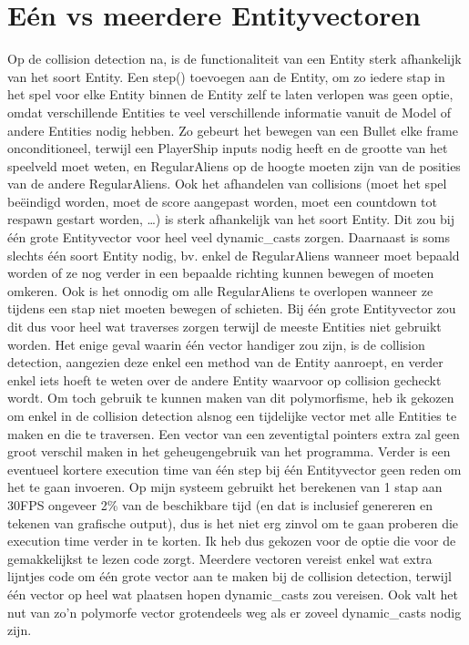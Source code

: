 \documentclass[11pt, a4paper]{article}
\begin{document}
\section {Eén vs meerdere Entityvectoren}
Op de collision detection na, is de functionaliteit van een Entity sterk afhankelijk van het soort Entity. Een step() toevoegen aan de Entity, om zo iedere stap in het spel voor elke Entity binnen de Entity zelf te laten verlopen was geen optie, omdat verschillende Entities te veel verschillende informatie vanuit de Model of andere Entities nodig hebben. Zo gebeurt het bewegen van een Bullet elke frame onconditioneel, terwijl een PlayerShip inputs nodig heeft en de grootte van het speelveld moet weten, en RegularAliens op de hoogte moeten zijn van de posities van de andere RegularAliens. Ook het afhandelen van collisions (moet het spel beëindigd worden, moet de score aangepast worden, moet een countdown tot respawn gestart worden, …) is sterk afhankelijk van het soort Entity. Dit zou bij één grote Entityvector voor heel veel dynamic\_casts zorgen. Daarnaast is soms slechts één soort Entity nodig, bv. enkel de RegularAliens wanneer moet bepaald worden of ze nog verder in een bepaalde richting kunnen bewegen of moeten omkeren. Ook is het onnodig om alle RegularAliens te overlopen wanneer ze tijdens een stap niet moeten bewegen of schieten. Bij één grote Entityvector zou dit dus voor heel wat traverses zorgen terwijl de meeste Entities niet gebruikt worden. Het enige geval waarin één vector handiger zou zijn, is de collision detection, aangezien deze enkel een method van de Entity aanroept, en verder enkel iets hoeft te weten over de andere Entity waarvoor op collision gecheckt wordt. Om toch gebruik te kunnen maken van dit polymorfisme, heb ik gekozen om enkel in de collision detection alsnog een tijdelijke vector met alle Entities te maken en die te traversen. Een vector van een zeventigtal pointers extra zal geen groot verschil maken in het geheugengebruik van het programma. Verder is een eventueel kortere execution time van één step bij één Entityvector geen reden om het te gaan invoeren. Op mijn systeem gebruikt het berekenen van 1 stap aan 30FPS ongeveer 2\% van de beschikbare tijd (en dat is inclusief genereren en tekenen van grafische output), dus is het niet erg zinvol om te gaan proberen die execution time verder in te korten. Ik heb dus gekozen voor de optie die voor de gemakkelijkst te lezen code zorgt. Meerdere vectoren vereist enkel wat extra lijntjes code om één grote vector aan te maken bij de collision detection, terwijl één vector op heel wat plaatsen hopen dynamic\_casts zou vereisen. Ook valt het nut van zo'n polymorfe vector grotendeels weg als er zoveel dynamic\_casts nodig zijn.

\end{document}
